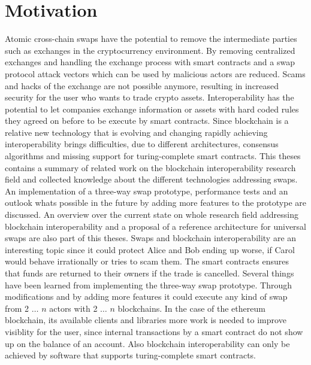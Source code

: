 \section{Motivation}
\label{sec:intro:motivation}
Atomic cross-chain swaps have the potential to remove the intermediate parties such as exchanges in the cryptocurrency environment. By removing centralized exchanges and handling the exchange process with smart contracts and a swap protocol attack vectors which can be used by malicious actors are reduced. Scams and hacks of the exchange are not possible anymore, resulting in increased security for the user who wants to trade crypto assets. Interoperability has the potential to let companies exchange information or assets with hard coded rules they agreed on before to be execute by smart contracts. Since blockchain is a relative new technology that is evolving and changing rapidly achieving interoperability brings difficulties, due to different architectures, consensus algorithms and missing support for turing-complete smart contracts. This theses contains a summary of related work on the blockchain interoperability research field and collected knowledge about the different technologies addressing swaps. An implementation of a three-way swap prototype, performance tests and an outlook whats possible in the future by adding more features to the prototype are discussed. An overview over the current state on whole research field addressing blockchain interoperability and a proposal of a reference architecture for universal swaps are also part of this theses. Swaps and blockchain interoperability are an interesting topic since it could protect Alice and Bob ending up worse, if Carol would behave irrationally or tries to scam them. The smart contracts ensures that funds are returned to their owners if the trade is cancelled. Several things have been learned from implementing the three-way swap prototype. Through modifications and by adding more features it could execute any kind of swap from 2 $\dots$ $n$ actors with 2 $\dots$ $n$ blockchains. In the case of the ethereum blockchain, its available clients and libraries more work is needed to improve visiblity for the user, since internal transactions by a smart contract do not show up on the balance of an account. Also blockchain interoperability can only be achieved by software that supports turing-complete smart contracts.




